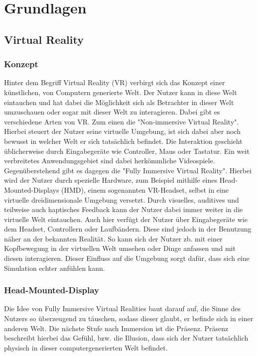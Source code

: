 \section{Grundlagen}
\subsection{Virtual Reality}
\subsubsection{Konzept}

Hinter dem Begriff Virtual Reality (VR) verbirgt sich das Konzept einer
künstlichen, von Computern generierte Welt. Der Nutzer kann in diese Welt
eintauchen und hat dabei die Möglichkeit sich als Betrachter in dieser Welt
umzuschauen oder sogar mit dieser Welt zu interagieren.
Dabei gibt es verschiedene Arten von VR. Zum einen die "Non-immersive Virtual Reality".
Hierbei steuert der Nutzer seine virtuelle Umgebung, ist sich dabei aber noch bewusst
in welcher Welt er sich tatsächlich befindet. Die Interaktion geschieht üblicherweise durch
Eingabegeräte wie Controller, Maus oder Tastatur. Ein weit verbreitetes Anwendungsgebiet sind
dabei herkömmliche Videospiele.
Gegenüberstehend gibt es dagegen die "Fully Immersive Virtual Reality". Hierbei wird der Nutzer durch
spezielle Hardware, zum Beispiel mithilfe eines Head-Mounted-Displays (HMD), einem sogenannten VR-Headset,
selbst in eine virtuelle dreidimensionale Umgebung versetzt.
Durch visuelles, auditives und teilweise auch haptisches Feedback kann der Nutzer dabei immer weiter
in die virtuelle Welt eintauchen.
Auch hier verfügt der Nutzer über Eingabegeräte wie dem Headset, Controllern oder Laufbändern. Diese sind
jedoch in der Benutzung näher an der bekannten Realität. So kann sich der Nutzer zb. mit einer Kopfbewegung
in der virtuellen Welt umsehen oder Dinge anfassen und mit diesen interagieren. Dieser Einfluss auf die
Umgebung sorgt dafür, dass sich eine Simulation echter anfühlen kann.


\subsubsection{Head-Mounted-Display}
Die Idee von Fully Immersive Virtual Realities baut darauf auf, die Sinne des Nutzers so überzeugend zu täuschen,
sodass dieser glaubt, er befinde sich in einer anderen Welt. Die nächste Stufe nach Immersion ist die
Präsenz. Präsenz beschreibt hierbei das Gefühl, bzw. die Illusion, dass sich der Nutzer tatsächlich
physisch in dieser computergenerierten Welt befindet. \parencite{Doerner2022}

